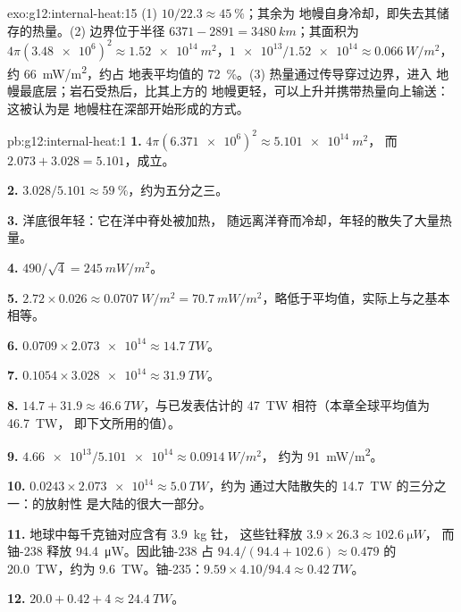 \begin{solution}{exo:g12:internal-heat:15}
(1) $10/22.3 \approx \qty{45}{\percent}$；其余为
地幔自身冷却，即失去其储存的热量。(2) 边界位于半径 $6371 - 2891 =
\qty{3480}{km}$；其面积为 $4\pi (\num{3.48e6})^2 \approx
\qty{1.52e14}{m^2}$，$\num{1e13}/\num{1.52e14} \approx
\qty{0.066}{W/m^2}$，约 \qty{66}{mW/m^2}，约占
地表平均值的 \qty{72}{\percent}。(3) 热量通过传导穿过边界，进入
地幔最底层；岩石受热后，比其上方的
地幔更轻，可以上升并携带热量向上输送：这被认为是
地幔柱在深部开始形成的方式。
\end{solution}

\begin{solution}{pb:g12:internal-heat:1}
\textbf{1.} $4\pi (\num{6.371e6})^2 \approx \qty{5.101e14}{m^2}$，
而 $2.073 + 3.028 = 5.101$，成立。

\textbf{2.} $3.028/5.101 \approx \qty{59}{\percent}$，约为五分之三。

\textbf{3.} 洋底很年轻：它在洋中脊处被加热，
随远离洋脊而冷却，年轻的散失了大量热量。

\textbf{4.} $490/\sqrt{4} = \qty{245}{mW/m^2}$。

\textbf{5.} $2.72 \times 0.026 \approx \qty{0.0707}{W/m^2} =
\qty{70.7}{mW/m^2}$，略低于平均值，实际上与之基本相等。

\textbf{6.} $0.0709 \times \num{2.073e14} \approx \qty{14.7}{TW}$。

\textbf{7.} $0.1054 \times \num{3.028e14} \approx \qty{31.9}{TW}$。

\textbf{8.} $14.7 + 31.9 \approx \qty{46.6}{TW}$，与已发表估计的
\qty{47}{TW} 相符（本章全球平均值为 \qty{46.7}{TW}，
即下文所用的值）。

\textbf{9.} $\num{4.66e13}/\num{5.101e14} \approx \qty{0.0914}{W/m^2}$，
约为 \qty{91}{mW/m^2}。

\textbf{10.} $0.0243 \times \num{2.073e14} \approx \qty{5.0}{TW}$，约为
通过大陆散失的 \qty{14.7}{TW} 的三分之一：的放射性
是大陆的很大一部分。

\textbf{11.} 地球中每千克铀对应含有 \qty{3.9}{kg} 钍，
这些钍释放 $3.9 \times 26.3 \approx \qty{102.6}{\micro W}$，
而铀-238 释放 \qty{94.4}{\micro W}。因此铀-238 占
$94.4/(94.4 + 102.6) \approx 0.479$ 的 \qty{20.0}{TW}，约为
\qty{9.6}{TW}。铀-235：$9.59 \times 4.10/94.4 \approx \qty{0.42}{TW}$。

\textbf{12.} $20.0 + 0.42 + 4 \approx \qty{24.4}{TW}$。


\end{solution}
